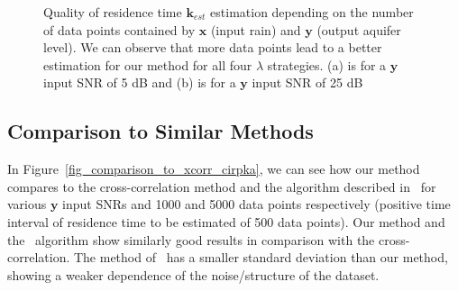 \documentclass[]{elsarticle} %
\begin{document}
\begin{figure}[H]
    \centering
    \caption{Quality of residence time $\textbf{k}_{est}$  estimation depending on the number of data points contained by $\textbf{x}$ (input rain) and $\textbf{y}$ (output aquifer level). We can observe that more data points lead to a better estimation for our method for all four  $\lambda$  strategies. (a) is for a $\textbf{y}$ input SNR of 5 dB and (b) is for a $\textbf{y}$ input SNR of 25 dB}
    \label{fig_kSNR_vs_length}
\end{figure}

\subsection{Comparison to Similar Methods}

In Figure~\ref{fig_comparison_to_xcorr_cirpka}, we can see how our method compares to the cross-correlation method and the algorithm described in~\cite{Z_Hydro_Cirpka2007} for various $\textbf{y}$ input SNRs and 1000 and 5000 data points respectively (positive time interval of residence time to be estimated of 500 data points). Our method and the~\cite{Z_Hydro_Cirpka2007} algorithm show similarly good results in comparison with the cross-correlation. The method of~\cite{Z_Hydro_Cirpka2007} has a smaller standard deviation than our method, showing a weaker dependence of the noise/structure of the dataset.
\end{document}
